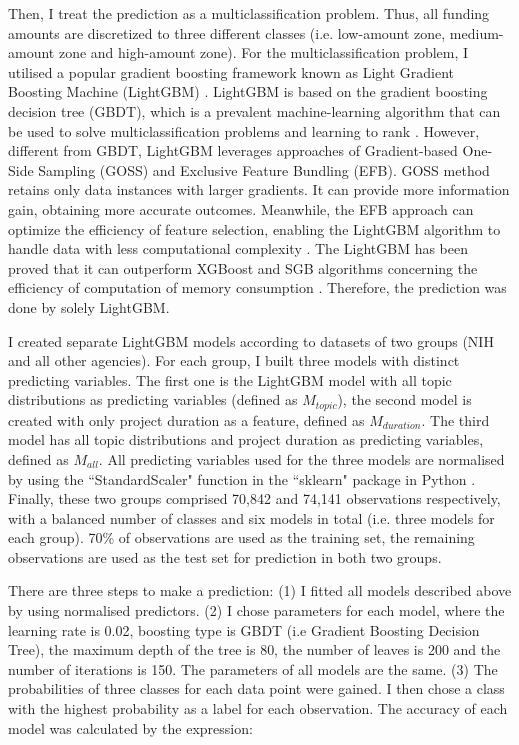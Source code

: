 Then, I treat the prediction as a multiclassification problem. Thus, all funding amounts are discretized to three different classes (i.e. low-amount zone, medium-amount zone and high-amount zone). For the multiclassification problem, I utilised a popular gradient boosting framework known as Light Gradient Boosting Machine (LightGBM) \cite{Ke2017}. LightGBM is based on the gradient boosting decision tree (GBDT), which is a prevalent machine-learning algorithm \cite{jerome2001} that can be used to solve multiclassification problems \cite{li2010} and learning to rank \cite{burges2010}. However, different from GBDT, LightGBM leverages approaches of Gradient-based One-Side Sampling (GOSS) and Exclusive Feature Bundling (EFB). GOSS method retains only data instances with larger gradients. It can provide more information gain, obtaining more accurate outcomes. Meanwhile, the EFB approach can optimize the efficiency of feature selection, enabling the LightGBM algorithm to handle data with less computational complexity \cite{Ke2017}. The LightGBM has been proved that it can outperform XGBoost and SGB algorithms concerning the efficiency of computation of memory consumption \cite{Ke2017}. Therefore, the prediction was done by solely LightGBM.

I created separate LightGBM models according to datasets of two groups (NIH and all other agencies). For each group, I built three models with distinct predicting variables. The first one is the LightGBM model with all topic distributions as predicting variables (defined as $M_{topic}$), the second model is created with only project duration as a feature, defined as $M_{duration}$. The third model has all topic distributions and project duration as predicting variables, defined as $M_{all}$. All predicting variables used for the three models are normalised by using the ``StandardScaler" function in the ``sklearn" package in Python \cite{sklearn}. Finally, these two groups comprised 70,842 and 74,141 observations respectively, with a balanced number of classes and six models in total (i.e. three models for each group). 70\% of observations are used as the training set, the remaining observations are used as the test set for prediction in both two groups.

There are three steps to make a prediction: (1) I fitted all models described above by using normalised predictors. (2) I chose parameters for each model, where the learning rate is 0.02, boosting type is GBDT (i.e Gradient Boosting Decision Tree), the maximum depth of the tree is 80, the number of leaves is 200 and the number of iterations is 150. The parameters of all models are the same. (3) The probabilities of three classes for each data point were gained. I then chose a class with the highest probability as a label for each observation. The accuracy of each model was calculated by the expression:

